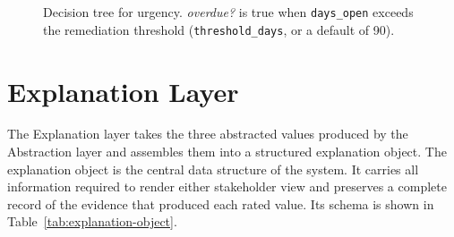 \begin{figure}[h]
\centering
{}
\caption{Decision tree for urgency. \emph{overdue?} is true when \texttt{days\_open} exceeds the remediation threshold (\texttt{threshold\_days}, or a default of 90).}
\label{fig:tree-urgency}
\end{figure}
\section{Explanation Layer}
\label{sec:explanation-layer}

The Explanation layer takes the three abstracted values produced by the Abstraction layer and assembles them into a structured explanation object. The explanation object is the central data structure of the system. It carries all information required to render either stakeholder view and preserves a complete record of the evidence that produced each rated value. Its schema is shown in Table~\ref{tab:explanation-object}.

